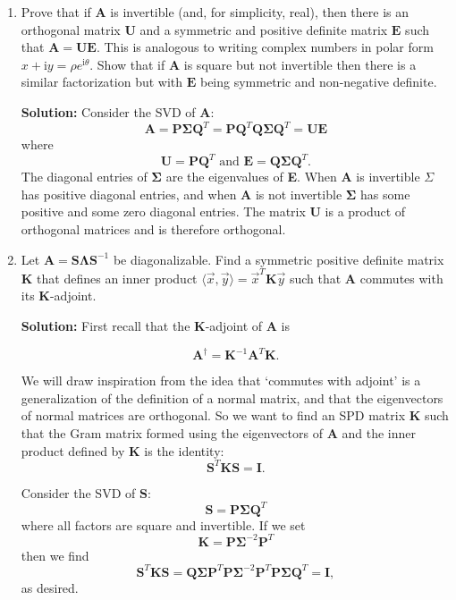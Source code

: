 \documentclass[11pt,fleqn]{article}
\newcommand{\mat}[1]{\mathbf{#1}}
\newcommand{\imag}{\mathrm{i}}
\begin{document}
\begin{enumerate}
\item Prove that if $\mathbf{A}$ is invertible (and, for simplicity, real), then there is an orthogonal matrix $\mathbf{U}$ and a symmetric and positive definite matrix $\mathbf{E}$ such that $\mathbf{A} = \mathbf{UE}$. This is analogous to writing complex numbers in polar form $x+\imag y = \rho e^{\imag \theta}$. Show that if $\mathbf{A}$ is square but not invertible then there is a similar factorization but with $\mathbf{E}$ being symmetric and non-negative definite.

{\bf Solution:} Consider the SVD of {\bf A}:
\[\mathbf{A} = \mathbf{P\Sigma Q}^T = \mathbf{PQ}^T\mathbf{Q\Sigma Q}^T = \mathbf{UE}\]
where
\[\mathbf{U} = \mathbf{PQ}^T\text{ and }\mathbf{E} = \mathbf{Q\Sigma Q}^T.\]
The diagonal entries of $\mathbf{\Sigma}$ are the eigenvalues of {\bf E}.
When {\bf A} is invertible $\Sigma$ has positive diagonal entries, and when {\bf A} is not invertible $\mathbf{\Sigma}$ has some positive and some zero diagonal entries.
The matrix {\bf U} is a product of orthogonal matrices and is therefore orthogonal.

\item Let $\mathbf{A} = \mathbf{S\Lambda S}^{-1}$ be diagonalizable. Find a symmetric positive definite matrix $\mathbf{K}$ that defines an inner product $\langle\vec{x},\vec{y}\rangle =\vec{x}^T\mat{K}\vec{y}$ such that $\mathbf{A}$ commutes with its $\mat{K}$-adjoint.

{\bf Solution:} First recall that the {\bf K}-adjoint of $\mathbf{A}$ is

\[\mathbf{A}^\dag = \mathbf{K}^{-1}\mathbf{A}^T\mathbf{K}.\]

We will draw inspiration from the idea that `commutes with adjoint' is a generalization of the definition of a normal matrix, and that the eigenvectors of normal matrices are orthogonal.
So we want to find an SPD matrix {\bf K} such that the Gram matrix formed using the eigenvectors of {\bf A} and the inner product defined by {\bf K} is the identity:
\[\mathbf{S}^T\mathbf{K}\mathbf{S} = \mathbf{I}.\]

Consider the SVD of $\mathbf{S}$:
\[\mathbf{S} = \mathbf{P\Sigma Q}^T\]
where all factors are square and invertible.
If we set
\[\mathbf{K} = \mathbf{P\Sigma}^{-2}\mathbf{P}^T\]
then we find
\[\mathbf{S}^T\mathbf{K}\mathbf{S} = \mathbf{Q\Sigma P}^T\mathbf{P\Sigma}^{-2}\mathbf{P}^T\mathbf{P\Sigma Q}^T = \mathbf{I},\]
as desired.


\end{enumerate}
\end{document}
